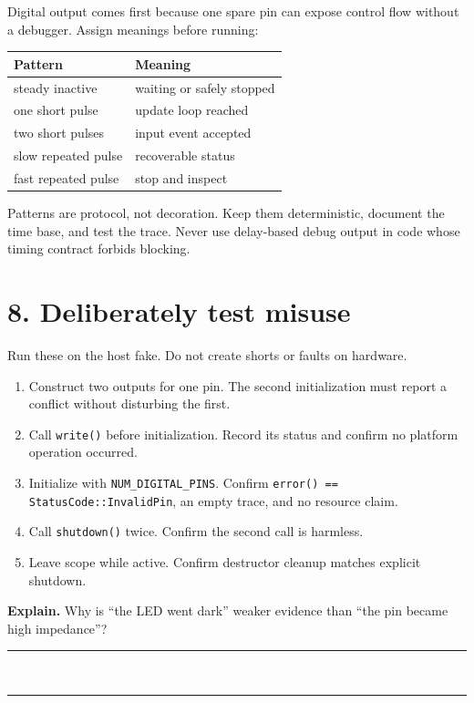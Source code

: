 \documentclass[11pt]{article}
\newcommand{\blankline}{\rule{0.96\linewidth}{0.35pt}}
\begin{document}
Digital output comes first because one spare pin can expose control flow
without a debugger. Assign meanings before running:

\begin{center}
\begin{tabular}{@{}ll@{}}
\toprule
Pattern & Meaning\\
\midrule
steady inactive & waiting or safely stopped\\
one short pulse & update loop reached\\
two short pulses & input event accepted\\
slow repeated pulse & recoverable status\\
fast repeated pulse & stop and inspect\\
\bottomrule
\end{tabular}
\end{center}

Patterns are protocol, not decoration. Keep them deterministic, document the
time base, and test the trace. Never use delay-based debug output in code whose
timing contract forbids blocking.

\section*{8. Deliberately test misuse}

Run these on the host fake. Do not create shorts or faults on hardware.

\begin{enumerate}
    \item Construct two outputs for one pin. The second initialization must
          report a conflict without disturbing the first.
    \item Call \texttt{write()} before initialization. Record its status and
          confirm no platform operation occurred.
    \item Initialize with \texttt{NUM\_DIGITAL\_PINS}. Confirm
          \texttt{error() == StatusCode::InvalidPin}, an empty trace, and no
          resource claim.
    \item Call \texttt{shutdown()} twice. Confirm the second call is harmless.
    \item Leave scope while active. Confirm destructor cleanup matches explicit
          shutdown.
\end{enumerate}

\textbf{Explain.} Why is ``the LED went dark'' weaker evidence than ``the pin
became high impedance''?
\par\blankline\\[5pt]\blankline
\end{document}
